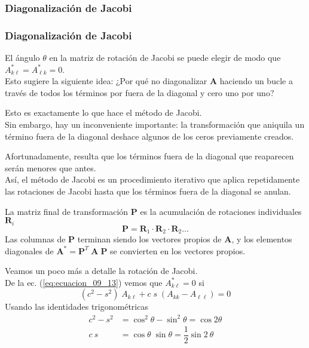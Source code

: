 \subsubsection{Diagonalización de Jacobi}
\begin{frame}
\frametitle{Diagonalización de Jacobi}
El ángulo $\theta$ en la matriz de rotación de Jacobi se puede elegir de modo que $A_{k \ell}^{*} = A_{\ell k}^{*} = 0$.
\\
\bigskip
Esto sugiere la siguiente idea: ¿Por qué no diagonalizar $\mathbf{A}$ haciendo un bucle a través de todos los términos por fuera de la diagonal y cero uno por uno?
\end{frame}
\begin{frame}
Esto es exactamente lo que hace el método de Jacobi.
\\
\bigskip
Sin embargo, hay un inconveniente importante: la transformación que aniquila un término fuera de la diagonal deshace algunos de los ceros previamente creados.
\end{frame}
\begin{frame}
Afortunadamente, resulta que los términos fuera de la diagonal que reaparecen serán menores que antes.
\\
\bigskip
Así, el método de Jacobi es un procedimiento iterativo que aplica repetidamente las rotaciones de Jacobi hasta que los términos fuera de la diagonal se anulan.
\end{frame}
\begin{frame}
La matriz final de transformación $\mathbf{P}$ es la acumulación de rotaciones individuales $\mathbf{R}_{i}$
\begin{equation}
\mathbf{P} = \mathbf{R}_{1} \cdot \mathbf{R}_{2} \cdot \mathbf{R}_{2} \ldots
\label{eq:ecuacion_09_14}
\end{equation}
Las columnas de $\mathbf{P}$ terminan siendo los vectores propios de $\mathbf{A}$, y los elementos diagonales de $\mathbf{A}^{*} = \mathbf{P}^{T} \; \mathbf{A \; P}$ se convierten en los vectores propios.
\end{frame}
\begin{frame}
Veamos un poco más a detalle la rotación de Jacobi.
\\
\bigskip
De la ec. (\ref{eq:ecuacion_09_13}) vemos que $A_{k \ell}^{*} = 0$ si
\begin{equation}
(c^{2} - s^{2}) \; A_{k \ell} + c \; s \; (A_{k k} - A_{\ell \ell}) = 0
\label{eq:ecuacion_a}
\end{equation}
Usando las identidades trigonométricas
\begin{align*}
c^{2} - s^{2} &= \cos^{2} \theta - \sin^{2} \theta = \cos 2 \theta \\
c \: s &= \cos \theta \; \sin \theta = \dfrac{1}{2} \sin 2 \: \theta
\end{align*}
\end{frame}
